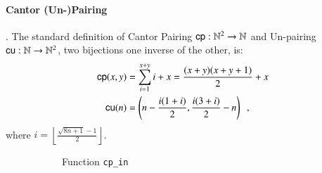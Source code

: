 \documentclass[preprint]{elsarticle}
\theoremstyle{remark}
\begin{document}
\paragraph{Cantor (Un-)Pairing}. The standard definition of Cantor Pairing $\mathsf{cp} : \mathbb{N}^2 \to \mathbb{N}$ and Un-pairing $\mathsf{cu} : \mathbb{N} \to \mathbb{N}^2$, two bijections one inverse of the other, is:
\begin{align}
\label{align: cp analitically}
\mathsf{cp}(x,y) & = \sum_{i=1}^{x+y}i + x = \frac{(x + y)(x + y + 1)}{2} + x
\\
\label{align: cu analitically}
\mathsf{cu}(n)  & = \left( n - \frac{i(1+i)}{2}, \frac{i(3+i)}{2} - n \right)
\enspace ,
\end{align}
where $i = \left\lfloor \frac{\sqrt{8n + 1} - 1}{2} \right\rfloor $.

\begin{figure}
\begin{subfigure}{.975\textwidth}
    \centering
{}
    \caption{Function \lstinline|cp_in|}
    \label{sfig:cp input}
\end{subfigure}
\\
\begin{subfigure}{.975\textwidth}
\centering
{}
\end{subfigure}
\end{figure}
\end{document}
